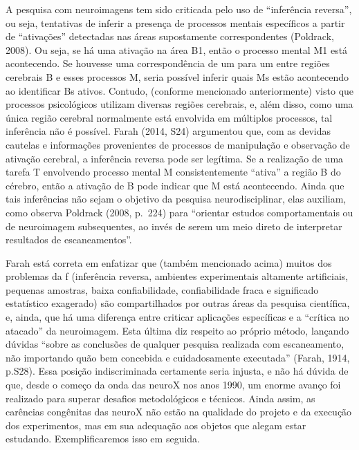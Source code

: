 A pesquisa com neuroimagens tem sido criticada pelo uso de ``inferência
reversa'', ou seja, tentativas de inferir a presença de processos
mentais específicos a partir de ``ativações'' detectadas nas áreas
supostamente correspondentes (Poldrack, 2008). Ou seja, se há uma
ativação na área B1, então o processo mental M1 está acontecendo. Se
houvesse uma correspondência de um para um entre regiões cerebrais B e
esses processos M, seria possível inferir quais Ms estão acontecendo ao
identificar Bs ativos. Contudo, (conforme mencionado anteriormente)
visto que processos psicológicos utilizam diversas regiões cerebrais, e,
além disso, como uma única região cerebral normalmente está envolvida em
múltiplos processos, tal inferência não é possível. Farah (2014, S24)
argumentou que, com as devidas cautelas e informações provenientes de
processos de manipulação e observação de ativação cerebral, a inferência
reversa pode ser legítima. Se a realização de uma tarefa T envolvendo
processo mental M consistentemente ``ativa'' a região B do cérebro,
então a ativação de B pode indicar que M está acontecendo. Ainda que
tais inferências não sejam o objetivo da pesquisa neurodisciplinar, elas
auxiliam, como observa Poldrack (2008, p.~224) para ``orientar estudos
comportamentais ou de neuroimagem subsequentes, ao invés de serem um
meio direto de interpretar resultados de escaneamentos''.

Farah está correta em enfatizar que (também mencionado acima) muitos dos
problemas da f (inferência reversa, ambientes experimentais altamente
artificiais, pequenas amostras, baixa confiabilidade, confiabilidade
fraca e significado estatístico exagerado) são compartilhados por outras
áreas da pesquisa científica, e, ainda, que há uma diferença entre
criticar aplicações específicas e a ``crítica no atacado'' da
neuroimagem. Esta última diz respeito ao próprio método, lançando
dúvidas ``sobre as conclusões de qualquer pesquisa realizada com
escaneamento, não importando quão bem concebida e cuidadosamente
executada'' (Farah, 1914, p.S28). Essa posição indiscriminada certamente
seria injusta, e não há dúvida de que, desde o começo da onda das neuroX
nos anos 1990, um enorme avanço foi realizado para superar desafios
metodológicos e técnicos. Ainda assim, as carências congênitas das
neuroX não estão na qualidade do projeto e da execução dos experimentos,
mas em sua adequação aos objetos que alegam estar estudando.
Exemplificaremos isso em seguida.

